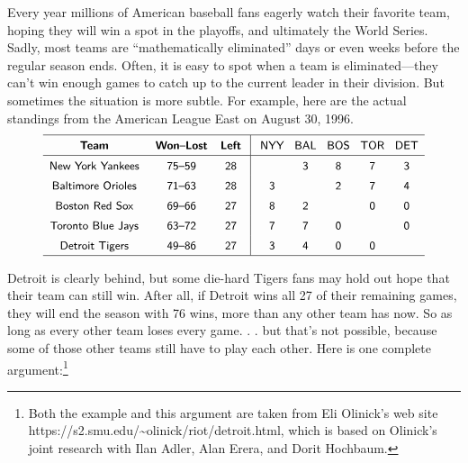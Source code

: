 Every year millions of American baseball fans eagerly watch their favorite team, hoping they will win a spot in the playoffs, and ultimately the World Series.
Sadly, most teams are “mathematically eliminated” days or even weeks before the regular season ends.
Often, it is easy to spot when a team is eliminated—they can’t win enough games to catch up to the current leader in their division.
But sometimes the situation is more subtle.
For example, here are the actual standings from the American League East on August 30, 1996.
\[
\mbox{\sffamily\fontsize{9}{15}\selectfont\renewcommand{\arraystretch}{1.05}$
\begin{array}{c@{\hspace{1.4em}}c@{\hspace{1.1em}}c@{\hspace{0.8em}}|@{\hspace{0.8em}}c@{\hspace{0.9em}}c@{\hspace{0.9em}}c@{\hspace{0.9em}}c@{\hspace{0.9em}}c}
\hline
\mbox{\bfseries Team} & \mbox{{\bfseries Won}–{\bfseries Lost}} & \mbox{\bfseries Left} & \mbox{NYY} & \mbox{BAL} & \mbox{BOS} & \mbox{TOR} & \mbox{DET}\\
\hline
\mbox{New York Yankees} & \mbox{75–59} & \mbox{28} & & \mbox{3} & \mbox{8} & \mbox{7} & \mbox{3}\\
\mbox{Baltimore Orioles} & \mbox{71–63} & \mbox{28} & \mbox{3} & & \mbox{2} & \mbox{7} & \mbox{4}\\
\mbox{Boston Red Sox} & \mbox{69–66} & \mbox{27} & \mbox{8} & \mbox{2} & & \mbox{0} & \mbox{0}\\
\mbox{Toronto Blue Jays} & \mbox{63–72} & \mbox{27} & \mbox{7} & \mbox{7} & \mbox{0} & & \mbox{0}\\
\mbox{Detroit Tigers} & \mbox{49–86} & \mbox{27} & \mbox{3} & \mbox{4} & \mbox{0} & \mbox{0} & \\
\hline
\end{array}$}
\]

Detroit is clearly behind, but some die-hard Tigers fans may hold out hope that their team can still win.
After all, if Detroit wins all 27 of their remaining games, they will end the season with 76 wins, more than any other team has now.
So as long as every other team loses every game. . . but that’s not possible, because some of those other teams still have to play each other.
Here is one complete argument:\footnote{Both the example and this argument are taken from Eli Olinick’s web site https://s2.smu.edu/\textasciitilde olinick/riot/detroit.html, which is based on Olinick’s joint research with Ilan Adler, Alan Erera, and Dorit Hochbaum.}


